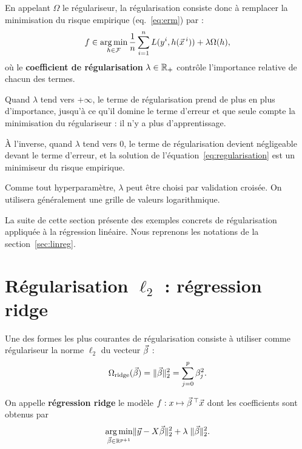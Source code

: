 En appelant $\Omega$ le régulariseur, la régularisation consiste donc à
remplacer la minimisation du risque empirique (eq.~\eqref{eq:erm}) par :
\begin{equation}
  \label{eq:regularisation}
  f \in \argmin_{h \in \FF} \frac{1}{n} \sum_{i=1}^n L(y^i, h(\xx^i)) + 
  \lambda \Omega(h),
\end{equation}
où le \textbf{coefficient de régularisation} $\lambda \in \mathbb{R}_+$ contrôle
l'importance relative de chacun des termes.


Quand $\lambda$ tend vers $+\infty$, le terme de régularisation prend de plus
en plus d'importance, jusqu'à ce qu'il domine le terme d'erreur et que seule
compte la minimisation du régulariseur : il n'y a plus d'apprentissage. %
  
À l'inverse, quand $\lambda$ tend vers $0$, le terme de régularisation devient
négligeable devant le terme d'erreur, et la solution de
l'équation~\eqref{eq:regularisation} est un minimiseur du risque
empirique.%

Comme tout hyperparamètre, $\lambda$ peut être choisi par validation
croisée. On utilisera généralement une grille de valeurs logarithmique.

La suite de cette section présente des exemples concrets de régularisation
appliquée à la régression linéaire. Nous reprenons les notations de la
section~\ref{sec:linreg}.


\section{Régularisation $\ell_2$  : régression ridge}
\label{sec:ridge_regression}
Une des formes les plus courantes de régularisation %
consiste à utiliser comme régulariseur la norme $\ell_2$ du vecteur 
$\bbeta$ :  
\begin{equation}
  \label{eq:l2norm_reg}
  \Omega_{\text{ridge}}(\bbeta) = \ltwonorm{\bbeta}^2 = \sum_{j=0}^p \beta_j^2.
\end{equation}


On appelle \textbf{régression ridge} le modèle $f: x \mapsto \bbeta^\top \xx$ dont
les coefficients sont obtenus par
\begin{equation}
  \label{eq:ridgereg}
  \argmin_{\bbeta \in \RR^{p+1}} \ltwonorm{\yy - X \bbeta}^2 + 
  \lambda \; \ltwonorm{\bbeta}^2.
\end{equation}    

